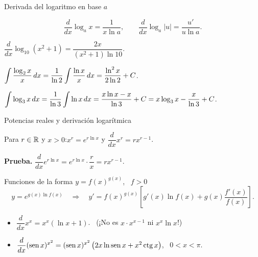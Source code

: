 \documentclass[10pt,aspectratio=169]{beamer}
\begin{document}
\begin{frame}{Derivada del logaritmo en base $a$}
  \begin{teorema}
    \[ \frac{d}{dx}\log_ax=\frac{1}{x\ln a},\qquad \frac{d}{dx}\log_a|u|=\frac{u'}{u\ln a}. \]
  \end{teorema}
  \begin{ejemplo}[1]
    $\dfrac{d}{dx}\log_{10}(x^2+1)=\dfrac{2x}{(x^2+1)\ln10}$.
  \end{ejemplo}
  \begin{ejemplo}[2]
    $\displaystyle\int\frac{\log_2x}{x}\,dx=\frac1{\ln2}\int\frac{\ln x}{x}\,dx=\frac{\ln^2x}{2\ln2}+C$.
  \end{ejemplo}
  \begin{ejemplo}[3: partes]
    $\displaystyle\int\log_3x\,dx=\frac1{\ln3}\int\ln x\,dx=\frac{x\ln x-x}{\ln3}+C=x\log_3x-\frac{x}{\ln3}+C$.
  \end{ejemplo}
\end{frame}

\begin{frame}{Potencias reales y derivación logarítmica}
  \begin{teorema}
    Para $r\in\mathbb{R}$ y $x>0$:\qquad $x^r=e^{r\ln x}$ \quad y \quad $\dfrac{d}{dx}x^r=rx^{r-1}$.
  \end{teorema}
  \textbf{Prueba.} $\dfrac{d}{dx}e^{r\ln x}=e^{r\ln x}\cdot\dfrac rx=rx^{r-1}$.
  \begin{block}{Funciones de la forma $y=f(x)^{g(x)}$, \ $f>0$}
    \[ y=e^{g(x)\ln f(x)}\quad\Rightarrow\quad y'=f(x)^{g(x)}\left[g'(x)\ln f(x)+g(x)\frac{f'(x)}{f(x)}\right]. \]
  \end{block}
  \begin{ejemplo}
    \begin{itemize}
      \item $\dfrac{d}{dx}x^x=x^x(\ln x+1)$. \ (¡No es $x\cdot x^{x-1}$ ni $x^x\ln x$!)
      \item $\dfrac{d}{dx}(\operatorname{sen} x)^{x^2}=(\operatorname{sen} x)^{x^2}\left(2x\ln\operatorname{sen} x+x^2\operatorname{ctg} x\right)$, \ $0<x<\pi$.
    \end{itemize}
  \end{ejemplo}
\end{frame}
\end{document}
